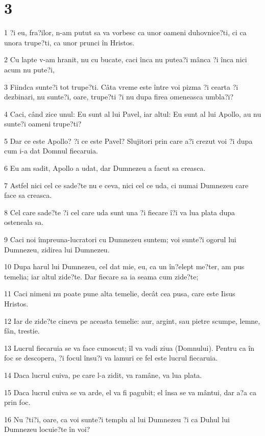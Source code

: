 \chapter{3}

\par 1 ?i eu, fra?ilor, n-am putut sa va vorbesc ca unor oameni duhovnice?ti, ci ca unora trupe?ti, ca unor prunci în Hristos.
\par 2 Cu lapte v-am hranit, nu cu bucate, caci înca nu putea?i mânca ?i înca nici acum nu pute?i,
\par 3 Fiindca sunte?i tot trupe?ti. Câta vreme este între voi pizma ?i cearta ?i dezbinari, nu sunte?i, oare, trupe?ti ?i nu dupa firea omeneasca umbla?i?
\par 4 Caci, când zice unul: Eu sunt al lui Pavel, iar altul: Eu sunt al lui Apollo, au nu sunte?i oameni trupe?ti?
\par 5 Dar ce este Apollo? ?i ce este Pavel? Slujitori prin care a?i crezut voi ?i dupa cum i-a dat Domnul fiecaruia.
\par 6 Eu am sadit, Apollo a udat, dar Dumnezeu a facut sa creasca.
\par 7 Astfel nici cel ce sade?te nu e ceva, nici cel ce uda, ci numai Dumnezeu care face sa creasca.
\par 8 Cel care sade?te ?i cel care uda sunt una ?i fiecare î?i va lua plata dupa osteneala sa.
\par 9 Caci noi împreuna-lucratori cu Dumnezeu suntem; voi sunte?i ogorul lui Dumnezeu, zidirea lui Dumnezeu.
\par 10 Dupa harul lui Dumnezeu, cel dat mie, eu, ca un în?elept me?ter, am pus temelia; iar altul zide?te. Dar fiecare sa ia seama cum zide?te;
\par 11 Caci nimeni nu poate pune alta temelie, decât cea pusa, care este Iisus Hristos.
\par 12 Iar de zide?te cineva pe aceasta temelie: aur, argint, sau pietre scumpe, lemne, fân, trestie.
\par 13 Lucrul fiecaruia se va face cunoscut; îl va vadi ziua (Domnului). Pentru ca în foc se descopera, ?i focul însu?i va lamuri ce fel este lucrul fiecaruia.
\par 14 Daca lucrul cuiva, pe care l-a zidit, va ramâne, va lua plata.
\par 15 Daca lucrul cuiva se va arde, el va fi pagubit; el însa se va mântui, dar a?a ca prin foc.
\par 16 Nu ?ti?i, oare, ca voi sunte?i templu al lui Dumnezeu ?i ca Duhul lui Dumnezeu locuie?te în voi?
